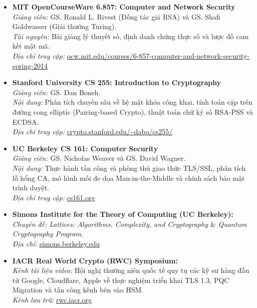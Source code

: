 \documentclass[
]{article}
\providecommand{\tightlist}{%
  \setlength{\itemsep}{0pt}\setlength{\parskip}{0pt}}
\begin{document}
\begin{itemize}
\tightlist
\item
  \textbf{MIT OpenCourseWare 6.857: Computer and Network Security}\\
  \emph{Giảng viên:} GS. Ronald L. Rivest (Đồng tác giả RSA) và GS.
  Shafi Goldwasser (Giải thưởng Turing).\\
  \emph{Tài nguyên:} Bài giảng lý thuyết số, định danh chứng thực số và
  lược đồ cam kết mật mã.\\
  \emph{Địa chỉ truy cập:}
  \href{https://ocw.mit.edu/courses/6-857-computer-and-network-security-spring-2014/}{ocw.mit.edu/courses/6-857-computer-and-network-security-spring-2014}
\item
  \textbf{Stanford University CS 255: Introduction to Cryptography}\\
  \emph{Giảng viên:} GS. Dan Boneh.\\
  \emph{Nội dung:} Phân tích chuyên sâu về hệ mật khóa công khai, tính
  toán cặp trên đường cong elliptic (Pairing-based Crypto), thuật toán
  chữ ký số RSA-PSS và ECDSA.\\
  \emph{Địa chỉ truy cập:}
  \href{https://crypto.stanford.edu/~dabo/cs255/}{crypto.stanford.edu/\textasciitilde dabo/cs255/}
\item
  \textbf{UC Berkeley CS 161: Computer Security}\\
  \emph{Giảng viên:} GS. Nicholas Weaver và GS. David Wagner.\\
  \emph{Nội dung:} Thực hành tấn công và phòng thủ giao thức TLS/SSL,
  phân tích lỗ hổng CA, mô hình mối đe dọa Man-in-the-Middle và chính
  sách bảo mật trình duyệt.\\
  \emph{Địa chỉ truy cập:} \href{https://cs161.org/}{cs161.org}
\item
  \textbf{Simons Institute for the Theory of Computing (UC Berkeley):}\\
  \emph{Chuyên đề:} \emph{Lattices: Algorithms, Complexity, and
  Cryptography} \& \emph{Quantum Cryptography Program}.\\
  \emph{Địa chỉ:}
  \href{https://simons.berkeley.edu/}{simons.berkeley.edu}
\item
  \textbf{IACR Real World Crypto (RWC) Symposium:}\\
  \emph{Kênh tài liệu video:} Hội nghị thường niên quốc tế quy tụ các kỹ
  sư hàng đầu từ Google, Cloudflare, Apple về thực nghiệm triển khai TLS
  1.3, PQC Migration và tấn công kênh bên vào HSM.\\
  \emph{Kênh lưu trữ:} \href{https://rwc.iacr.org/}{rwc.iacr.org}
\end{itemize}
\end{document}
